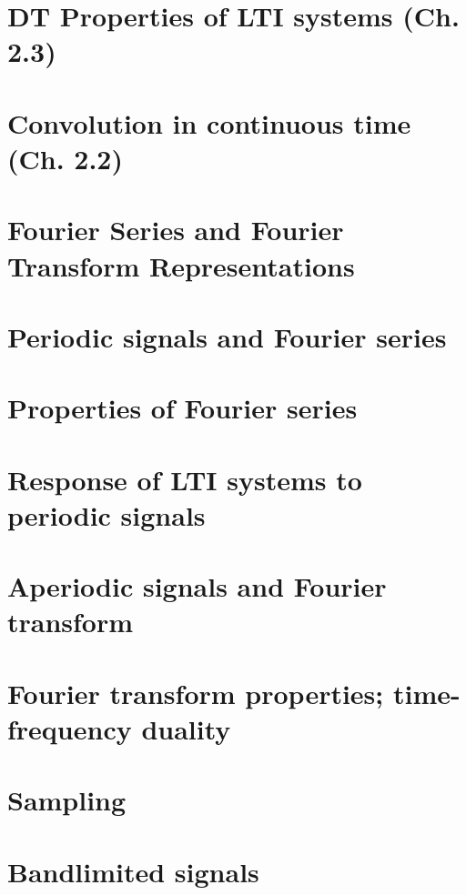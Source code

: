 \documentclass{article}
\begin{document}
\section{DT Properties of LTI systems (Ch. 2.3)} %

\newpage

\section{Convolution in continuous time (Ch. 2.2)}

\newpage

\section*{Fourier Series and Fourier Transform Representations}
\section{Periodic signals and Fourier series}

\newpage

\section{Properties of Fourier series}
\newpage

\section{Response of LTI systems to periodic signals}
\newpage

\section{Aperiodic signals and Fourier transform}
\newpage

\section{Fourier transform properties; time-frequency duality}
\newpage

\section*{Sampling}
\section{Bandlimited signals}
\newpage
\end{document}
